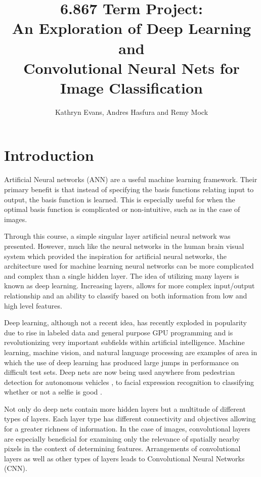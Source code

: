 \documentclass[12pt, twocolumn]{article}
\begin{document}
\title{ 6.867 Term Project: \\ An Exploration of Deep Learning and \\ Convolutional Neural Nets for Image Classification\\ }
 \author{Kathryn Evans, Andres Hasfura and Remy Mock}
\maketitle

\section{ Introduction} 
Artificial Neural networks (ANN) are a useful machine learning framework. Their primary benefit is that instead of specifying the basis functions relating input to output, the basis function is learned.  This is especially useful for when the optimal basis function is complicated or non-intuitive, such as in the case of images.


Through this course, a simple singular layer artificial neural network was presented. However, much like the neural networks in the human brain visual system which provided the inspiration for artificial neural networks, the architecture used for machine learning neural networks can be more complicated and complex than a single hidden layer. The idea of utilizing many layers is known as deep learning.  Increasing layers, allows for more complex input/output relationship and an ability to classify based on both information from low and high level features.

Deep learning, although not a recent idea, has recently exploded in popularity due to rise in labeled data and general purpose GPU programming and is revolutionizing very important subfields within artificial intelligence. Machine learning, machine vision, and natural language processing are examples of area in which the use of deep learning has produced large jumps in performance on difficult test sets. Deep nets are now being used anywhere from pedestrian detection for autonomous vehicles \cite{Szarvas2006}, to facial expression recognition \cite{Li2015} to classifying whether or not a selfie is good \cite{Karpathy}. 
	
Not only do deep nets contain more hidden layers but a multitude of different types of layers. Each layer type has different connectivity and objectives allowing for a greater richness of information. In the case of images, convolutional layers are especially beneficial for examining only the relevance of spatially nearby pixels in the context of determining features. Arrangements of convolutional layers as well as other types of layers leads to Convolutional Neural Networks (CNN). 
\end{document}
